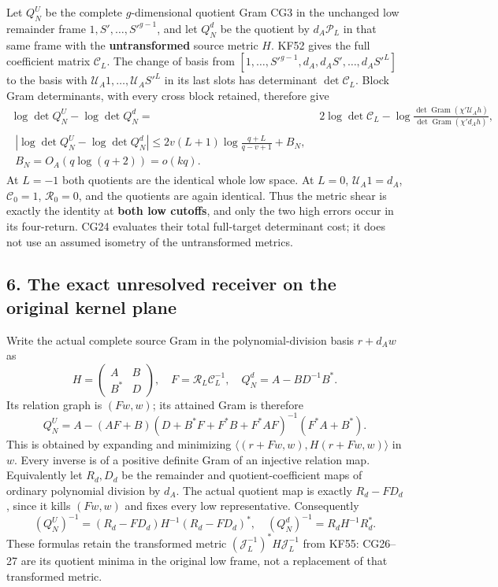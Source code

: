 \documentclass[11pt]{article}
\begin{document}
Let \(Q_N^U\) be the complete \(g\)-dimensional quotient Gram CG3 in the unchanged low remainder frame \(1,S',\ldots,S'^{g-1}\), and let \(Q_N^d\) be the quotient by \(d_A\mathcal P_L\) in that same frame with the \textbf{untransformed} source metric \(H\). KF52 gives the full coefficient matrix \(\mathcal C_L\). The change of basis from \([1,\ldots,S'^{g-1},d_A,d_AS',\ldots,d_AS'^L]\) to the basis with \(\mathcal U_A1,\ldots,\mathcal U_AS'^L\) in its last slots has determinant \(\det\mathcal C_L\). Block Gram determinants, with every cross block retained, therefore give \[
\begin{split}
\log\det Q_N^U-\log\det Q_N^d
={}&2\log\det\mathcal C_L
-\log\frac{\det\operatorname{Gram}(\chi'\mathcal U_Ah)}
{\det\operatorname{Gram}(\chi'd_Ah)},\\
\boxed{\begin{gathered}|\log\det Q_N^U-\log\det Q_N^d|
\le 2v(L+1)\log\frac{q+L}{q-v+1}+B_N,\\ B_N=O_A(q\log(q+2))=o(kq).\end{gathered}}
\end{split}\tag{CG24}
\] At \(L=-1\) both quotients are the identical whole low space. At \(L=0\), \(\mathcal U_A1=d_A\), \(\mathcal C_0=1\), \(\mathcal R_0=0\), and the quotients are again identical. Thus the metric shear is exactly the identity at \textbf{both low cutoffs}, and only the two high errors occur in its four-return. CG24 evaluates their total full-target determinant cost; it does not use an assumed isometry of the untransformed metrics.

\subsection{6. The exact unresolved receiver on the original kernel plane}\label{the-exact-unresolved-receiver-on-the-original-kernel-plane}

Write the actual complete source Gram in the polynomial-division basis \(r+d_Aw\) as \[
H=\begin{pmatrix}A&B\\B^*&D\end{pmatrix},\quad
F=\mathcal R_L\mathcal C_L^{-1},\quad
Q_N^d=A-BD^{-1}B^*.
\tag{CG25}
\] Its relation graph is \((Fw,w)\); its attained Gram is therefore \[
Q_N^U=A-(AF+B)
(D+B^*F+F^*B+F^*AF)^{-1}(F^*A+B^*).
\tag{CG26}
\] This is obtained by expanding and minimizing \(\langle(r+Fw,w),H(r+Fw,w)\rangle\) in \(w\). Every inverse is of a positive definite Gram of an injective relation map. Equivalently let \(R_d,D_d\) be the remainder and quotient-coefficient maps of ordinary polynomial division by \(d_A\). The actual quotient map is exactly \(R_d-FD_d\), since it kills \((Fw,w)\) and fixes every low representative. Consequently \[
(Q_N^U)^{-1}=(R_d-FD_d)H^{-1}(R_d-FD_d)^*,
\quad (Q_N^d)^{-1}=R_dH^{-1}R_d^*.
\tag{CG27}
\] These formulas retain the transformed metric \((\mathcal J_L^{-1})^*H\mathcal J_L^{-1}\) from KF55: CG26--27 are its quotient minima in the original low frame, not a replacement of that transformed metric.
\end{document}
